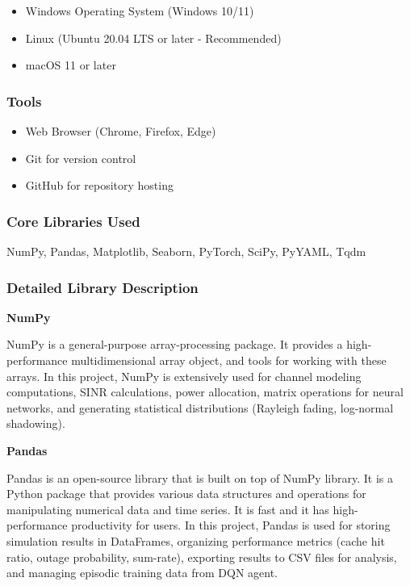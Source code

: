 \documentclass[12pt,a4paper]{article}
\begin{document}
\begin{itemize}
    \item Windows Operating System (Windows 10/11)
    \item Linux (Ubuntu 20.04 LTS or later - Recommended)
    \item macOS 11 or later
\end{itemize}

\subsubsection{Tools}

\begin{itemize}
    \item Web Browser (Chrome, Firefox, Edge)
    \item Git for version control
    \item GitHub for repository hosting
\end{itemize}

\subsubsection{Core Libraries Used}

NumPy, Pandas, Matplotlib, Seaborn, PyTorch, SciPy, PyYAML, Tqdm

\subsubsection{Detailed Library Description}

\textbf{NumPy}

NumPy is a general-purpose array-processing package. It provides a high-performance multidimensional array object, and tools for working with these arrays. In this project, NumPy is extensively used for channel modeling computations, SINR calculations, power allocation, matrix operations for neural networks, and generating statistical distributions (Rayleigh fading, log-normal shadowing).

\textbf{Pandas}

Pandas is an open-source library that is built on top of NumPy library. It is a Python package that provides various data structures and operations for manipulating numerical data and time series. It is fast and it has high-performance productivity for users. In this project, Pandas is used for storing simulation results in DataFrames, organizing performance metrics (cache hit ratio, outage probability, sum-rate), exporting results to CSV files for analysis, and managing episodic training data from DQN agent.
\end{document}
